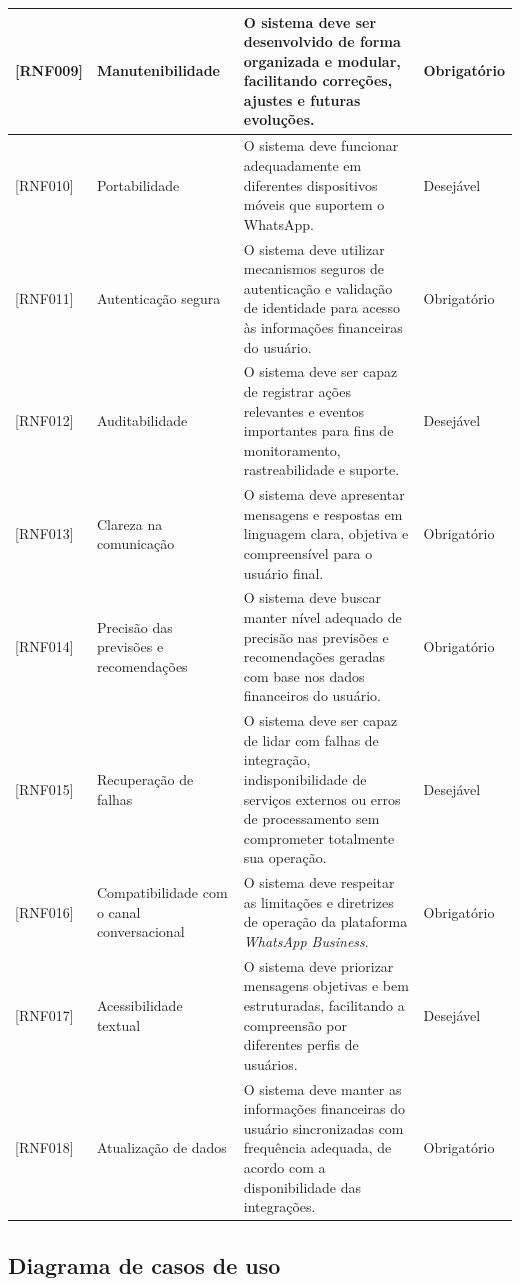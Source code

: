 \begin{longtable}{|p{1.8cm}|p{3.2cm}|p{7.0cm}|p{2.1cm}|}
{[RNF009]} & Manutenibilidade & O sistema deve ser desenvolvido de forma organizada e modular, facilitando correções, ajustes e futuras evoluções. & Obrigatório \\ \hline
{[RNF010]} & Portabilidade & O sistema deve funcionar adequadamente em diferentes dispositivos móveis que suportem o WhatsApp. & Desejável \\ \hline
{[RNF011]} & Autenticação segura & O sistema deve utilizar mecanismos seguros de autenticação e validação de identidade para acesso às informações financeiras do usuário. & Obrigatório \\ \hline
{[RNF012]} & Auditabilidade & O sistema deve ser capaz de registrar ações relevantes e eventos importantes para fins de monitoramento, rastreabilidade e suporte. & Desejável \\ \hline
{[RNF013]} & Clareza na comunicação & O sistema deve apresentar mensagens e respostas em linguagem clara, objetiva e compreensível para o usuário final. & Obrigatório \\ \hline
{[RNF014]} & Precisão das previsões e recomendações & O sistema deve buscar manter nível adequado de precisão nas previsões e recomendações geradas com base nos dados financeiros do usuário. & Obrigatório \\ \hline
{[RNF015]} & Recuperação de falhas & O sistema deve ser capaz de lidar com falhas de integração, indisponibilidade de serviços externos ou erros de processamento sem comprometer totalmente sua operação. & Desejável \\ \hline
{[RNF016]} & Compatibilidade com o canal conversacional & O sistema deve respeitar as limitações e diretrizes de operação da plataforma \textit{WhatsApp Business}. & Obrigatório \\ \hline
{[RNF017]} & Acessibilidade textual & O sistema deve priorizar mensagens objetivas e bem estruturadas, facilitando a compreensão por diferentes perfis de usuários. & Desejável \\ \hline
{[RNF018]} & Atualização de dados & O sistema deve manter as informações financeiras do usuário sincronizadas com frequência adequada, de acordo com a disponibilidade das integrações. & Obrigatório \\ \hline
\end{longtable}

\subsection{Diagrama de casos de uso}

